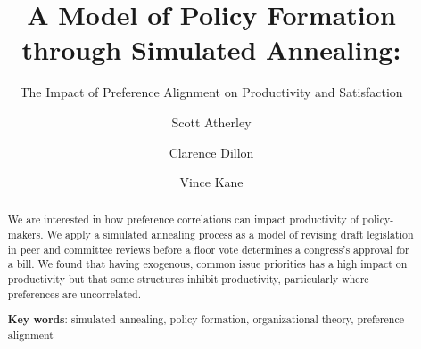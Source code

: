 \documentclass[pdftex,12pt,oribibl]{llncs}
\begin{document}
\title{A Model of Policy Formation through Simulated Annealing:}
\subtitle{The Impact of Preference Alignment on Productivity and Satisfaction}
\author{Scott Atherley \and Clarence Dillon \and Vince Kane}

\maketitle

%
%

\begin{abstract}
 We are interested in how preference correlations can impact productivity of policy-makers. 
 We apply a simulated annealing process as a model of revising draft legislation in peer and committee reviews before a floor vote determines a congress's approval for a bill.
 We found that having exogenous, common issue priorities has a high impact on productivity but that some structures inhibit productivity, particularly where preferences are uncorrelated.
 
 \textbf{Key words}: simulated annealing, policy formation, organizational theory, preference alignment
\end{abstract}
\end{document}
